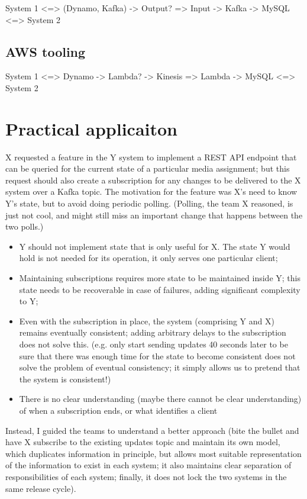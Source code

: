 System 1 <=> (Dynamo, Kafka) -> Output? => Input -> Kafka -> MySQL <=> System 2

\subsection{AWS tooling}
System 1 <=> Dynamo -> Lambda? -> Kinesis => Lambda -> MySQL <=> System 2

\section{Practical applicaiton}
X requested a feature in the Y system to implement a REST API endpoint that can be queried for the current state of a particular media assignment; but this request should also create a subscription for any changes to be delivered to the X system over a Kafka topic. The motivation for the feature was X’s need to know Y’s state, but to avoid doing periodic polling. (Polling, the team X reasoned, is just not cool, and might still miss an important change that happens between the two polls.)
\begin{itemize}
  \item Y should not implement state that is only useful for X. The state Y would hold is not needed for its operation, it only serves one particular client;
  \item Maintaining subscriptions requires more state to be maintained inside Y; this state needs to be recoverable in case of failures, adding significant complexity to Y;
  \item  Even with the subscription in place, the system (comprising Y and X) remains eventually consistent; adding arbitrary delays to the subscription does not solve this. (e.g. only start sending updates 40 seconds later to be sure that there was enough time for the state to become consistent does not solve the problem of eventual consistency; it simply allows us to pretend that the system is consistent!)
  \item There is no clear understanding (maybe there cannot be clear understanding) of when a subscription ends, or what identifies a client
\end{itemize}
Instead, I guided the teams to understand a better approach (bite the bullet and have X subscribe to the existing updates topic and maintain its own model, which duplicates information in principle, but allows most suitable representation of the information to exist in each system; it also maintains clear separation of responsibilities of each system; finally, it does not lock the two systems in the same release cycle).


\printbibliography

